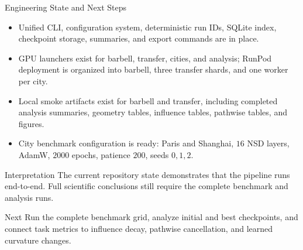 \documentclass[11pt]{beamer}
\begin{document}
\begin{frame}{Engineering State and Next Steps}
  \begin{itemize}
    \item Unified CLI, configuration system, deterministic run IDs, SQLite index,
    checkpoint storage, summaries, and export commands are in place.
    \item GPU launchers exist for barbell, transfer, cities, and analysis; RunPod
    deployment is organized into barbell, three transfer shards, and one worker per city.
    \item Local smoke artifacts exist for barbell and transfer, including completed
    analysis summaries, geometry tables, influence tables, pathwise tables, and figures.
    \item City benchmark configuration is ready: Paris and Shanghai, \(16\) NSD layers,
    AdamW, \(2000\) epochs, patience \(200\), seeds \(0,1,2\).
  \end{itemize}

  \begin{alertblock}{Interpretation}
    The current repository state demonstrates that the pipeline runs end-to-end.
    Full scientific conclusions still require the complete benchmark and analysis runs.
  \end{alertblock}

  \begin{block}{Next}
    Run the complete benchmark grid, analyze initial and best checkpoints, and
    connect task metrics to influence decay, pathwise cancellation, and learned
    curvature changes.
  \end{block}
\end{frame}
\end{document}
